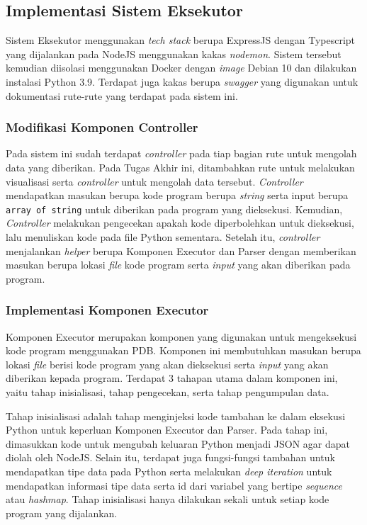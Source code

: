 \subsection{Implementasi Sistem Eksekutor}
Sistem Eksekutor menggunakan \textit{tech stack} berupa ExpressJS dengan Typescript yang dijalankan pada NodeJS menggunakan kakas \textit{nodemon}. Sistem tersebut kemudian diisolasi menggunakan Docker dengan \textit{image} Debian 10 dan dilakukan instalasi Python 3.9. Terdapat juga kakas berupa \textit{swagger} yang digunakan untuk dokumentasi rute-rute yang terdapat pada sistem ini.

\subsubsection{Modifikasi Komponen Controller}
Pada sistem ini sudah terdapat \textit{controller} pada tiap bagian rute untuk mengolah data yang diberikan. Pada Tugas Akhir ini, ditambahkan rute untuk melakukan visualisasi serta \textit{controller} untuk mengolah data tersebut. \textit{Controller} mendapatkan masukan berupa kode program berupa \textit{string} serta input berupa \verb|array of string| untuk diberikan pada program yang dieksekusi. Kemudian, \textit{Controller} melakukan pengecekan apakah kode diperbolehkan untuk dieksekusi, lalu menuliskan kode pada file Python sementara. Setelah itu, \textit{controller} menjalankan \textit{helper} berupa Komponen Executor dan Parser dengan memberikan masukan berupa lokasi \textit{file} kode program serta \textit{input} yang akan diberikan pada program.


\subsubsection{Implementasi Komponen Executor}
Komponen Executor merupakan komponen yang digunakan untuk mengeksekusi kode program menggunakan PDB. Komponen ini membutuhkan masukan berupa lokasi \textit{file} berisi kode program yang akan dieksekusi serta \textit{input} yang akan diberikan kepada program. Terdapat 3 tahapan utama dalam komponen ini, yaitu tahap inisialisasi, tahap pengecekan, serta tahap pengumpulan data.

Tahap inisialisasi adalah tahap menginjeksi kode tambahan ke dalam eksekusi Python untuk keperluan Komponen Executor dan Parser. Pada tahap ini, dimasukkan kode untuk mengubah keluaran Python menjadi JSON agar dapat diolah oleh NodeJS. Selain itu, terdapat juga fungsi-fungsi tambahan untuk mendapatkan tipe data pada Python serta melakukan \textit{deep iteration} untuk mendapatkan informasi tipe data serta id dari variabel yang bertipe \textit{sequence} atau \textit{hashmap}. Tahap inisialisasi hanya dilakukan sekali untuk setiap kode program yang dijalankan.

